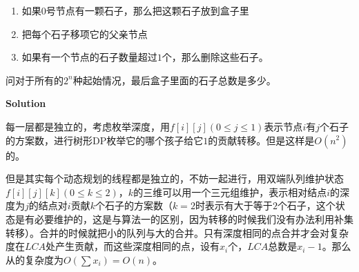 \documentclass[11pt]{article}
\begin{document}
\begin{enumerate}
\begin{enumerate}
\item 如果\(0\)号节点有一颗石子，那么把这颗石子放到盒子里
\item 把每个石子移项它的父亲节点
\item 如果有一个节点的石子数量超过\(1\)个，那么删除这些石子。
\end{enumerate}

问对于所有的\(2^n\)种起始情况，最后盒子里面的石子总数是多少。

\textbf{Solution}

每一层都是独立的，考虑枚举深度，用\(f[i][j] (0 \leq j \leq 1)\)表示节点\(i\)有\(j\)个石子的方案数，进行树形DP枚举它的哪个孩子给它\(1\)的贡献转移。但是这样是\(O(n^2)\)的。

但是其实每个动态规划的线程都是独立的，不妨一起进行，用双端队列维护状态\(f[i][j][k] (0 \leq k \leq 2)\)，\(k\)的三维可以用一个三元组维护，表示相对结点\(i\)的深度为\(j\)的结点对\(i\)贡献\(k\)个石子的方案数（\(k=2\)时表示有大于等于\(2\)个石子，这个状态是有必要维护的，这是与算法一的区别，因为转移的时候我们没有办法利用补集转移）。合并的时候就把小的队列与大的合并。只有深度相同的点合并才会对复杂度在\(LCA\)处产生贡献，而这些深度相同的点，设有\(x_i\)个，\(LCA\)总数是\(x_i-1\)。那么从的复杂度为\(O(\sum x_i)=O(n)\)。
\end{enumerate}
\end{document}
